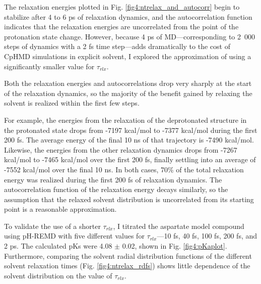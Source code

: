The relaxation energies plotted in Fig. \ref{fig4:ntrelax_and_autocorr} begin to
stabilize after 4 to 6 ps of relaxation dynamics, and the autocorrelation
function indicates that the relaxation energies are uncorrelated from the point
of the protonation state change. However, because 4 ps of MD---corresponding to
\mbox{2 000} steps of dynamics with a 2 fs time step---adds dramatically to the
cost of CpHMD simulations in explicit solvent, I explored the approximation of
using a significantly smaller value for $\tau _ {rlx}$.

Both the relaxation energies and autocorrelations drop very sharply at the start
of the relaxation dynamics, so the majority of the benefit gained by relaxing
the solvent is realized within the first few steps.

For example, the energies from the relaxation of the deprotonated structure in
the protonated state drops from -7197 kcal/mol to -7377 kcal/mol during the
first 200 fs. The average energy of the final 10 ns of that trajectory is -7490
kcal/mol. Likewise, the energies from the other relaxation dynamics drops from
-7267 kcal/mol to -7465 kcal/mol over the first 200 fs, finally settling into an
average of -7552 kcal/mol over the final 10 ns. In both cases, 70\% of the total
relaxation energy was realized during the first 200 fs of relaxation dynamics.
The autocorrelation function of the relaxation energy decays similarly, so the
assumption that the relaxed solvent distribution is uncorrelated from its
starting point is a reasonable approximation.

To validate the use of a shorter $\tau _ {rlx}$, I titrated the aspartate model
compound using pH-REMD with five different values for $\tau _ {rlx}$---10 fs, 40
fs, 100 fs, 200 fs, and 2 ps. The calculated pKs were 4.08 $\pm$ 0.02,
shown in Fig. \ref{fig4:pKaplot}.  Furthermore, comparing the solvent radial
distribution functions of the different solvent relaxation times (Fig.
\ref{fig4:ntrelax_rdfs}) shows little dependence of the solvent distribution on
the value of $\tau _ {rlx}$.

